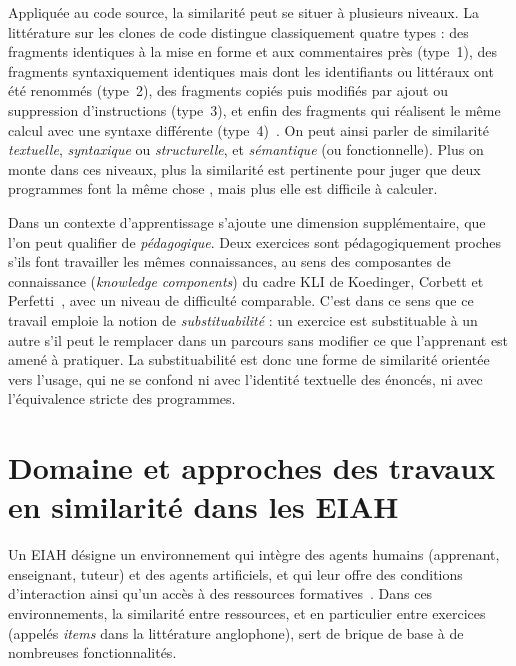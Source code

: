 Appliquée au code source, la similarité peut se situer à plusieurs niveaux. La littérature sur les clones de code distingue classiquement quatre types : des fragments identiques à la mise en forme et aux commentaires près (type~1), des fragments syntaxiquement identiques mais dont les identifiants ou littéraux ont été renommés (type~2), des fragments copiés puis modifiés par ajout ou suppression d'instructions (type~3), et enfin des fragments qui réalisent le même calcul avec une syntaxe différente (type~4)~\cite{roy2009clones}. On peut ainsi parler de similarité \emph{textuelle}, \emph{syntaxique} ou \emph{structurelle}, et \emph{sémantique} (ou fonctionnelle). Plus on monte dans ces niveaux, plus la similarité est pertinente pour juger que deux programmes \og font la même chose \fg{}, mais plus elle est difficile à calculer.

Dans un contexte d'apprentissage s'ajoute une dimension supplémentaire, que l'on peut qualifier de \emph{pédagogique}. Deux exercices sont pédagogiquement proches s'ils font travailler les mêmes connaissances, au sens des composantes de connaissance (\emph{knowledge components}) du cadre KLI de Koedinger, Corbett et Perfetti~\cite{koedinger2012kli}, avec un niveau de difficulté comparable. C'est dans ce sens que ce travail emploie la notion de \emph{substituabilité} : un exercice est substituable à un autre s'il peut le remplacer dans un parcours sans modifier ce que l'apprenant est amené à pratiquer. La substituabilité est donc une forme de similarité orientée vers l'usage, qui ne se confond ni avec l'identité textuelle des énoncés, ni avec l'équivalence stricte des programmes.

\section{Domaine et approches des travaux en similarité dans les EIAH}
\label{sec:domaine}

Un EIAH désigne un environnement qui intègre des agents humains (apprenant, enseignant, tuteur) et des agents artificiels, et qui leur offre des conditions d'interaction ainsi qu'un accès à des ressources formatives~\cite{tchounikine2002}. Dans ces environnements, la similarité entre ressources, et en particulier entre exercices (appelés \emph{items} dans la littérature anglophone), sert de brique de base à de nombreuses fonctionnalités.

